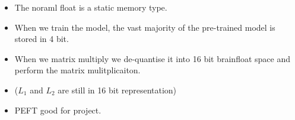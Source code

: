 \documentclass[11pt]{article}
\begin{document}
\begin{minipage}[l]{.5\linewidth}
    \begin{figure}[H]
        \centering
    \end{figure}    
\end{minipage}\hfill
\begin{minipage}[r]{.48\linewidth}
    \begin{itemize}
        \item The noraml float is a static memory type. 
        \item When we train the model, the vast majority of the pre-trained model is stored in 4 bit.
        \item When we matrix multiply we de-quantise it into 16 bit brainfloat space and perform the matrix mulitplicaiton.
        \item ($L_1$ and $L_2$ are still in 16 bit representation)
    \end{itemize}
\end{minipage}

\begin{minipage}[l]{.5\linewidth}
    \begin{figure}[H]
        \centering
    \end{figure}    
\end{minipage}\hfill
\begin{minipage}[r]{.48\linewidth}
    \begin{itemize}
        \item PEFT good for project.
    \end{itemize}
\end{minipage}
\end{document}
